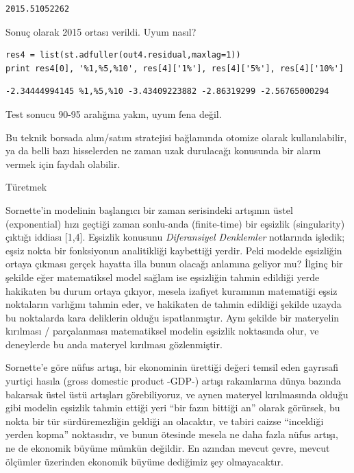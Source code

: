 \documentclass[12pt,fleqn]{article}\usepackage{../../common}
\begin{document}
\begin{verbatim}
2015.51052262
\end{verbatim}

Sonuç olarak 2015 ortası verildi. Uyum nasıl?

\begin{verbatim}
res4 = list(st.adfuller(out4.residual,maxlag=1))
print res4[0], '%1,%5,%10', res[4]['1%'], res[4]['5%'], res[4]['10%']
\end{verbatim}

\begin{verbatim}
-2.34444994145 %1,%5,%10 -3.43409223882 -2.86319299 -2.56765000294
\end{verbatim}

Test sonucu 90-95 aralığına yakın, uyum fena değil. 

Bu teknik borsada alım/satım stratejisi bağlamında otomize olarak
kullanılabilir, ya da belli bazı hisselerden ne zaman uzak durulacağı
konusunda bir alarm vermek için faydalı olabilir.

Türetmek

Sornette'in modelinin başlangıcı bir zaman serisindeki artışının üstel
(exponential) hızı geçtiği zaman sonlu-anda (finite-time) bir eşsizlik
(singularity) çıktığı iddiası [1,4]. Eşsizlik konusunu {\em Diferansiyel
  Denklemler} notlarında işledik; eşsiz nokta bir fonksiyonun analitikliği
kaybettiği yerdir. Peki modelde eşsizliğin ortaya çıkması gerçek hayatta
illa bunun olacağı anlamına geliyor mu? İlginç bir şekilde eğer
matematiksel model sağlam ise eşsizliğin tahmin edildiği yerde hakikaten bu
durum ortaya çıkıyor, mesela izafiyet kuramının matematiği eşsiz noktaların
varlığını tahmin eder, ve hakikaten de tahmin edildiği şekilde uzayda bu
noktalarda kara deliklerin olduğu ispatlanmıştır. Aynı şekilde bir
materyelin kırılması / parçalanması matematiksel modelin eşsizlik
noktasında olur, ve deneylerde bu anda materyel kırılması gözlenmiştir.

Sornette'e göre nüfus artışı, bir ekonominin ürettiği değeri temsil eden
gayrısafi yurtiçi hasıla (gross domestic product -GDP-) artışı rakamlarına
dünya bazında bakarsak üstel üstü artışları görebiliyoruz, ve aynen
materyel kırılmasında olduğu gibi modelin eşsizlik tahmin ettiği yeri ``bir
fazın bittiği an'' olarak görürsek, bu nokta bir tür sürdüremezliğin
geldiği an olacaktır, ve tabiri caizse ``inceldiği yerden kopma''
noktasıdır, ve bunun ötesinde mesela ne daha fazla nüfus artışı, ne de
ekonomik büyüme mümkün değildir. En azından mevcut çevre, mevcut ölçümler
üzerinden ekonomik büyüme dediğimiz şey olmayacaktır. 
\end{document}
